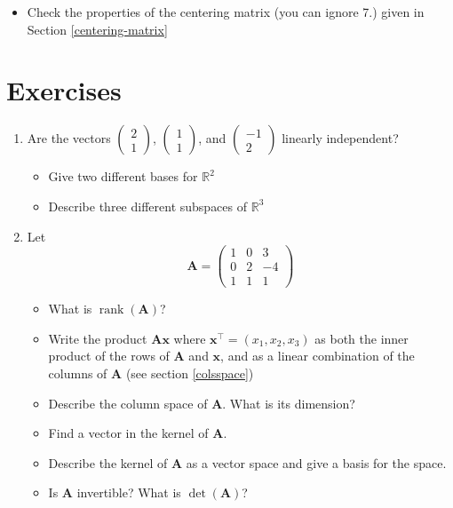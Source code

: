 \documentclass[]{book}
\providecommand{\tightlist}{%
  \setlength{\itemsep}{0pt}\setlength{\parskip}{0pt}}
\theoremstyle{definition}
\theoremstyle{definition}
\theoremstyle{definition}
\theoremstyle{remark}
\begin{document}
\begin{itemize}
\tightlist
\item
  Check the properties of the centering matrix (you can ignore 7.) given in Section \ref{centering-matrix}
\end{itemize}

\hypertarget{exercises-ch2}{%
\section{Exercises}\label{exercises-ch2}}

\begin{enumerate}
\def\labelenumi{\arabic{enumi}.}
\item
  Are the vectors \(\left( \begin{array}{c}2\\1\end{array}\right)\), \(\left( \begin{array}{c}1\\1\end{array}\right)\), and \(\left( \begin{array}{c}-1\\2\end{array}\right)\) linearly independent?

  \begin{itemize}
  \tightlist
  \item
    Give two different bases for \(\mathbb{R}^2\)
  \item
    Describe three different subspaces of \(\mathbb{R}^3\)
  \end{itemize}
\item
  Let \[\boldsymbol A= \left(\begin{array}{ccc}1&0&3\\
  0&2&-4\\
  1&1&1
  \end{array}\right)\]

  \begin{itemize}
  \tightlist
  \item
    What is \(\operatorname{rank}(\boldsymbol A)\)?
  \item
    Write the product \(\boldsymbol A\boldsymbol x\) where \(\boldsymbol x^\top=(x_1, x_2, x_3)\) as both the inner product of the rows of \(\boldsymbol A\) and \(\boldsymbol x\), and as a linear combination of the columns of \(\boldsymbol A\) (see section \ref{colsspace})
  \item
    Describe the column space of \(\boldsymbol A\). What is its dimension?
  \item
    Find a vector in the kernel of \(\boldsymbol A\).
  \item
    Describe the kernel of \(\boldsymbol A\) as a vector space and give a basis for the space.
  \item
    Is \(\boldsymbol A\) invertible? What is \(\det(\boldsymbol A)\)?
  \end{itemize}
\end{enumerate}
\end{document}
